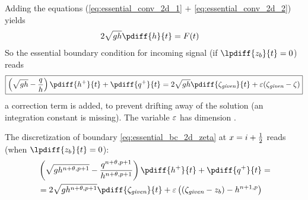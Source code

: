 Adding the equations (\eqref{eq:essential_conv_2d_1} $+$ \eqref{eq:essential_conv_2d_2}) yields
\begin{align}
    2 \sqrt{gh} \pdiff{h}{t} & = F(t)
\end{align}
%
So the essential boundary condition for incoming signal (if $\lpdiff{z_b}{t} = 0$) reads
\begin{align}
    {\boxed{
            \left(\sqrt{gh} - \frac{q}{h}\right) \pdiff{h^{+}}{t} + \pdiff{q^{+}}{t}  = 2 \sqrt{gh} \pdiff{\zeta_{\textit{given}}}{t}  + \eps(\zeta_{\textit{given}} - \zeta)
    }}\label{eq:essential_bc_2d_zeta}
\end{align}
a correction term is added, to prevent drifting away of the solution (an integration constant is missing).
The variable $\varepsilon$ has dimension \bunit{\metre\per\square\second}.

The discretization of  boundary \autoref{eq:essential_bc_2d_zeta} at $x=i+\frac{1}{2}$ reads (when $\lpdiff{z_b}{t}=0$):
\begin{align}
    &\left(\sqrt{gh^{n+\theta,p+1}} - \frac{q^{n+\theta,p+1}}{h^{n+\theta,p+1}}\right) \pdiff{h^{+}}{t} + \pdiff{q^{+}}{t}  =
    \nonumber \\*
    & = 2 \sqrt{gh^{n+\theta,p+1}} \pdiff{\zeta_{\textit{given}}}{t}
    + \eps \left( (\zeta_{\textit{given}} -z_b) - h^{n+1,p}   \right)
\end{align}
